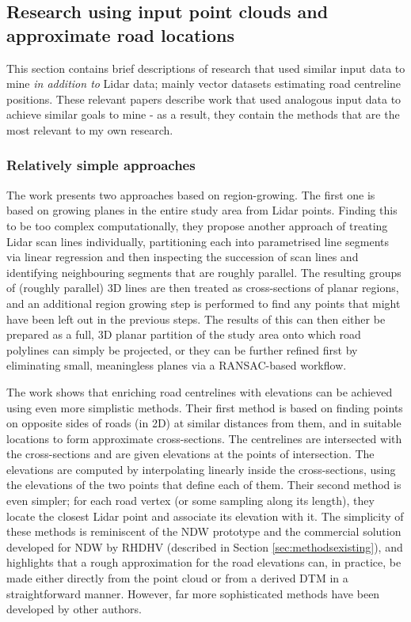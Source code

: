 \subsection{Research using input point clouds and approximate road locations}
\label{sub:lidaraccuracy_external}

This section contains brief descriptions of research that used similar input data to mine \textit{in addition to} Lidar data; mainly vector datasets estimating road centreline positions. These relevant papers describe work that used analogous input data to achieve similar goals to mine - as a result, they contain the methods that are the most relevant to my own research.

\subsubsection{Relatively simple approaches}

The work \cite{hatger_brenner_2003} presents two approaches based on region-growing. The first one is based on growing planes in the entire study area from Lidar points. Finding this to be too complex computationally, they propose another approach of treating Lidar scan lines individually, partitioning each into parametrised line segments via linear regression and then inspecting the succession of scan lines and identifying neighbouring segments that are roughly parallel. The resulting groups of (roughly parallel) 3D lines are then treated as cross-sections of planar regions, and an additional region growing step is performed to find any points that might have been left out in the previous steps. The results of this can then either be prepared as a full, 3D planar partition of the study area onto which road polylines can simply be projected, or they can be further refined first by eliminating small, meaningless planes via a RANSAC-based workflow.

The work \cite{cai_rasdorf_2008} shows that enriching road centrelines with elevations can be achieved using even more simplistic methods. Their first method is based on finding points on opposite sides of roads (in 2D) at similar distances from them, and in suitable locations to form approximate cross-sections. The centrelines are intersected with the cross-sections and are given elevations at the points of intersection. The elevations are computed by interpolating linearly inside the cross-sections, using the elevations of the two points that define each of them. Their second method is even simpler; for each road vertex  (or some sampling along its length), they locate the closest Lidar point and associate its elevation with it. The simplicity of these methods is reminiscent of the NDW prototype and the commercial solution developed for NDW by RHDHV (described in Section \ref{sec:methodsexisting}), and highlights that a rough approximation for the road elevations can, in practice, be made either directly from the point cloud or from a derived DTM in a straightforward manner. However, far more sophisticated methods have been developed by other authors.


